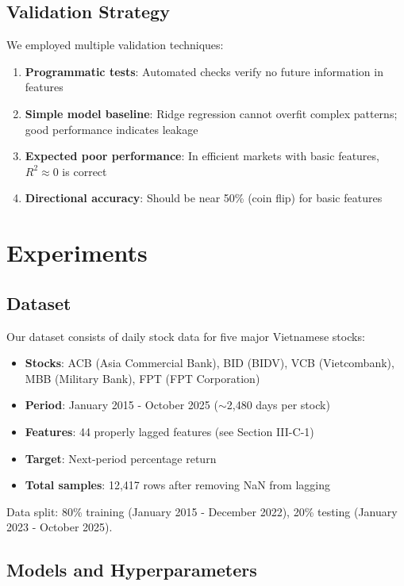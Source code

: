\documentclass[conference]{IEEEtran}
\begin{document}
\subsection{Validation Strategy}

We employed multiple validation techniques:

\begin{enumerate}
    \item \textbf{Programmatic tests}: Automated checks verify no future information in features
    \item \textbf{Simple model baseline}: Ridge regression cannot overfit complex patterns; good performance indicates leakage
    \item \textbf{Expected poor performance}: In efficient markets with basic features, $R^2 \approx 0$ is correct
    \item \textbf{Directional accuracy}: Should be near 50\% (coin flip) for basic features
\end{enumerate}

\section{Experiments}

\subsection{Dataset}

Our dataset consists of daily stock data for five major Vietnamese stocks:

\begin{itemize}
    \item \textbf{Stocks}: ACB (Asia Commercial Bank), BID (BIDV), VCB (Vietcombank), MBB (Military Bank), FPT (FPT Corporation)
    \item \textbf{Period}: January 2015 - October 2025 ($\sim$2,480 days per stock)
    \item \textbf{Features}: 44 properly lagged features (see Section III-C-1)
    \item \textbf{Target}: Next-period percentage return
    \item \textbf{Total samples}: 12,417 rows after removing NaN from lagging
\end{itemize}

Data split: 80\% training (January 2015 - December 2022), 20\% testing (January 2023 - October 2025).

\subsection{Models and Hyperparameters}
\end{document}
